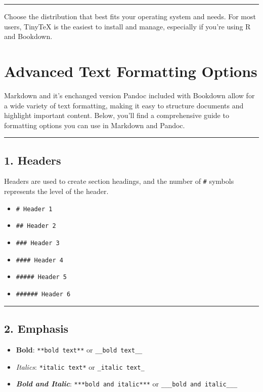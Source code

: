 \documentclass[
]{book}
\providecommand{\tightlist}{%
  \setlength{\itemsep}{0pt}\setlength{\parskip}{0pt}}
\theoremstyle{definition}
\theoremstyle{definition}
\theoremstyle{definition}
\theoremstyle{definition}
\theoremstyle{remark}
\begin{document}
\begin{center}\rule{0.5\linewidth}{0.5pt}\end{center}

Choose the distribution that best fits your operating system and needs. For most users, TinyTeX is the easiest to install and manage, especially if you're using R and Bookdown.

\chapter{Advanced Text Formatting Options}\label{markdownadvanced}

Markdown and it's enchanged version Pandoc included with Bookdown allow for a wide variety of text formatting, making it easy to structure documents and highlight important content. Below, you'll find a comprehensive guide to formatting options you can use in Markdown and Pandoc.

\begin{center}\rule{0.5\linewidth}{0.5pt}\end{center}

\section{1. Headers}\label{headers}

Headers are used to create section headings, and the number of \texttt{\#} symbols represents the level of the header.

\begin{itemize}
\tightlist
\item
  \texttt{\#\ Header\ 1}
\item
  \texttt{\#\#\ Header\ 2}
\item
  \texttt{\#\#\#\ Header\ 3}
\item
  \texttt{\#\#\#\#\ Header\ 4}
\item
  \texttt{\#\#\#\#\#\ Header\ 5}
\item
  \texttt{\#\#\#\#\#\#\ Header\ 6}
\end{itemize}

\begin{center}\rule{0.5\linewidth}{0.5pt}\end{center}

\section{2. Emphasis}\label{emphasis}

\begin{itemize}
\tightlist
\item
  \textbf{Bold}: \texttt{**bold\ text**} or \texttt{\_\_bold\ text\_\_}
\item
  \emph{Italics}: \texttt{*italic\ text*} or \texttt{\_italic\ text\_}
\item
  \textbf{\emph{Bold and Italic}}: \texttt{***bold\ and\ italic***} or \texttt{\_\_\_bold\ and\ italic\_\_\_}
\end{itemize}
\end{document}
